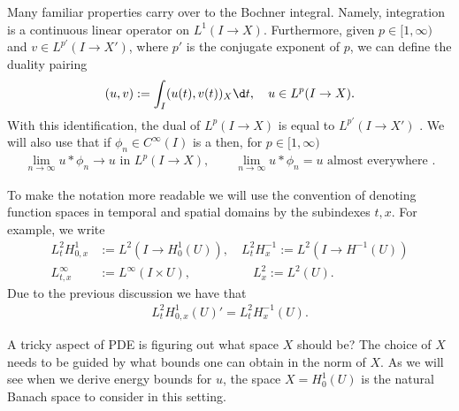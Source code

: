 \documentclass[
    a4paper,
    DIV=14,
    abstract=true,
    numbers=noenddot
]{scrartcl}
\begin{document}
Many familiar properties carry over to the Bochner integral. Namely, integration is a continuous linear operator on $L^1(I \to X)$. Furthermore, given $p \in [1,\infty)$ and $v \in L^{p'}(I \to X')$, where $p'$ is the conjugate exponent of $p$, we can define the duality pairing
\begin{align*}
 (u,v):= \int_I (u(t),v(t))_X \d t, \quad u \in L^p(I \to X).
\end{align*}
With this identification, the dual of $L^p(I \to X)$ is equal to $L^{p'}(I \to X')$ . We will also use that if $\phi_n \in C^\infty(I)$ is a  then, for $p \in [1, \infty)$ 
\begin{align}\label{approximation}
 \lim_{n \to \infty} u * \phi_n \to u \text{ in } L^p(I \to X),\quad \quad \lim_{n \to \infty} u * \phi_n=u \text{ almost everywhere }. 
\end{align}


To make the notation more readable we will use the convention of denoting function spaces in temporal and spatial domains by the subindexes $t,x$. For example, we write
\begin{align*}
 L^2_t H^1_{0,x} & := L^2(I \to H^1_0(U)), \quad L^2_t H^{-1}_{x} := L^2(I \to H^{-1}(U))   \\
 L_{t,x}^\infty & := L^\infty(I \times U), \quad\quad\qquad\quad  L^2_x     := L^2(U).
\end{align*}
Due to the previous discussion we have that
\begin{align}\label{duality}
 L^2_t H^1_{0,x}(U)' = L^2_t H^{-1}_{x}(U).
\end{align}

A tricky aspect of PDE is figuring out what space $X$ should be? The choice of $X$ needs to be guided by what bounds one can obtain in the norm of $X$. As we will see when we derive energy bounds for $u$, the space $X=H_0^1(U)$ is the natural Banach space to consider in this setting.
\end{document}

